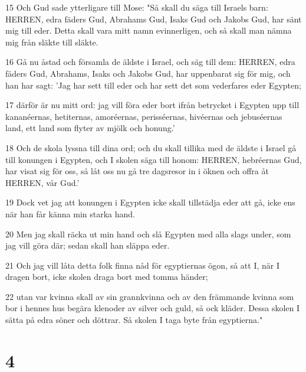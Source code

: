\par 15 Och Gud sade ytterligare till Mose: "Så skall du säga till Israels barn: HERREN, edra fäders Gud, Abrahams Gud, Isaks Gud och Jakobs Gud, har sänt mig till eder. Detta skall vara mitt namn evinnerligen, och så skall man nämna mig från släkte till släkte.
\par 16 Gå nu åstad och församla de äldste i Israel, och säg till dem: HERREN, edra fäders Gud, Abrahams, Isaks och Jakobs Gud, har uppenbarat sig för mig, och han har sagt: 'Jag har sett till eder och har sett det som vederfares eder Egypten;
\par 17 därför är nu mitt ord: jag vill föra eder bort ifrån betrycket i Egypten upp till kananéernas, hetiternas, amoréernas, perisséernas, hivéernas och jebuséernas land, ett land som flyter av mjölk och honung.'
\par 18 Och de skola lyssna till dina ord; och du skall tillika med de äldste i Israel gå till konungen i Egypten, och I skolen säga till honom: HERREN, hebréernas Gud, har visat sig för oss, så låt oss nu gå tre dagsresor in i öknen och offra åt HERREN, vår Gud.'
\par 19 Dock vet jag att konungen i Egypten icke skall tillstädja eder att gå, icke ens när han får känna min starka hand.
\par 20 Men jag skall räcka ut min hand och slå Egypten med alla slags under, som jag vill göra där; sedan skall han släppa eder.
\par 21 Och jag vill låta detta folk finna nåd för egyptiernas ögon, så att I, när I dragen bort, icke skolen draga bort med tomma händer;
\par 22 utan var kvinna skall av sin grannkvinna och av den främmande kvinna som bor i hennes hus begära klenoder av silver och guld, så ock kläder. Dessa skolen I sätta på edra söner och döttrar. Så skolen I taga byte från egyptierna."

\chapter{4}


